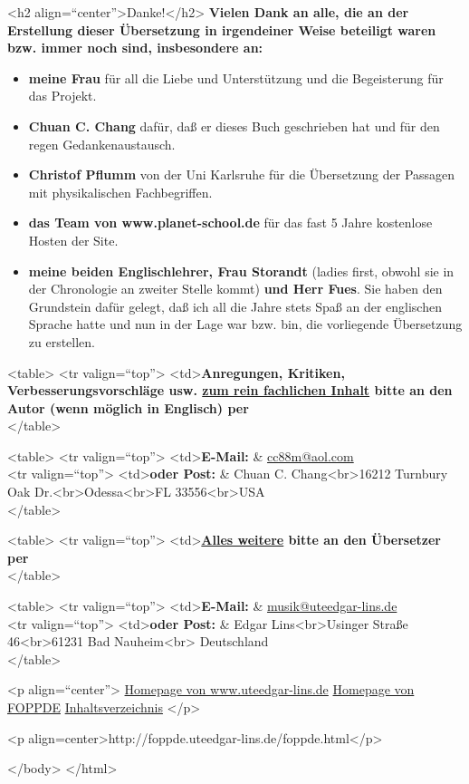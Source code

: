 


\label{Danke}

<h2 align=\enquote{center}>Danke!</h2>
\textbf{Vielen Dank an alle, die an der Erstellung dieser Übersetzung in irgendeiner Weise beteiligt waren bzw. immer noch sind, insbesondere an:}


\begin{itemize} 
 \item \textbf{meine Frau} für all die Liebe und Unterstützung und die Begeisterung für das Projekt.
 \item \textbf{Chuan C. Chang} dafür, daß er dieses Buch geschrieben hat und für den regen Gedankenaustausch.
 \item \textbf{Christof Pflumm} von der Uni Karlsruhe für die Übersetzung der Passagen mit physikalischen Fachbegriffen.
 \item \textbf{das Team von www.planet-school.de} für das fast 5 Jahre kostenlose Hosten der Site.
 \item \textbf{meine beiden Englischlehrer, Frau Storandt} (ladies first, obwohl sie in der Chronologie an zweiter Stelle kommt) \textbf{und Herr Fues}.
Sie haben den Grundstein dafür gelegt, daß ich all die Jahre stets Spaß an der englischen Sprache hatte und nun in der Lage war bzw. bin, die vorliegende Übersetzung zu erstellen.
\end{itemize}






\label{kontakt}

<table>
 <tr valign=\enquote{top}>
  <td>\textbf{Anregungen, Kritiken, Verbesserungsvorschläge usw. \underline{zum rein fachlichen Inhalt} bitte an den Autor (wenn möglich in Englisch) per}
   \\ 
</table>

<table>
 <tr valign=\enquote{top}>
  <td>\textbf{E-Mail:} & \hyperref[mailto:cc88m@aol.com?subject=foppde]{cc88m@aol.com} \\ 
 <tr valign=\enquote{top}>
  <td>\textbf{oder Post:} & Chuan C. Chang<br>16212 Turnbury Oak Dr.<br>Odessa<br>FL 33556<br>USA \\ 
</table>

\label{mailel}

<table>
 <tr valign=\enquote{top}>
  <td>\textbf{\underline{Alles weitere} bitte an den Übersetzer per} \\ 
</table>

<table>
 <tr valign=\enquote{top}>
  <td>\textbf{E-Mail:} & \hyperref[mailto:musik@uteedgar-lins.de?subject=foppde]{musik@uteedgar-lins.de} \\ 
 <tr valign=\enquote{top}>
  <td>\textbf{oder Post:} & Edgar Lins<br>Usinger Straße 46<br>61231 Bad Nauheim<br>
Deutschland \\ 
</table>



<p align=\enquote{center}>
\hyperref[http://www.uteedgar-lins.de/index.html]{Homepage von www.uteedgar-lins.de} 
\hyperref[./index.html]{Homepage von FOPPDE} 
\hyperref[Inhalt]{Inhaltsverzeichnis} 
</p>

<p align=center>http://foppde.uteedgar-lins.de/foppde.html</p>

</body>
</html>
